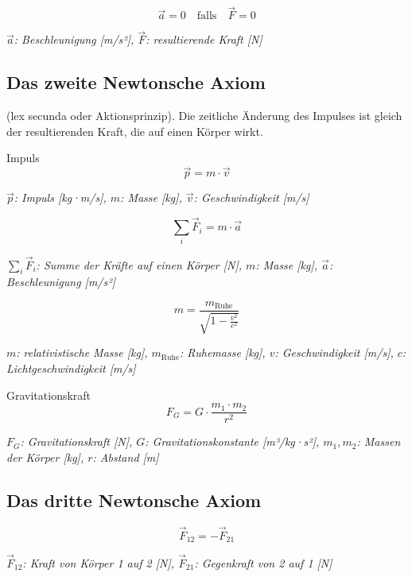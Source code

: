 \documentclass[a4paper,10pt]{article}
\newenvironment{displayformula}
{
	\begin{framed}
		\color{formulaColor}
	}
	{\end{framed}}
\newcommand{\formulalegend}[1]{%
	\par\vspace{0.5ex}%
	{{\color{legendColor}\RaggedRight\small\textit{#1}}}%
	\par\vspace{1.5ex}%
}
\begin{document}
\begin{displayformula}
	\[
	\vec{a} = 0 \quad \text{falls} \quad \vec{F} = 0
	\]
\end{displayformula}
\formulalegend{
	\( \vec{a} \): Beschleunigung [m/s²], \( \vec{F} \): resultierende Kraft [N]
}

\subsection{Das zweite Newtonsche Axiom}

\begin{displayformula}
	(lex secunda oder Aktionsprinzip). Die zeitliche Änderung des Impulses ist gleich der  
	resultierenden Kraft, die auf einen Körper wirkt.
\end{displayformula}

\begin{displayformula}
	Impuls
	\[
	\vec{p} = m \cdot \vec{v}
	\]
\end{displayformula}
\formulalegend{
	\( \vec{p} \): Impuls [kg·m/s], \( m \): Masse [kg], \( \vec{v} \): Geschwindigkeit [m/s]
}

\begin{displayformula}
	\[
	\sum_{i} \vec{F}_i = m \cdot \vec{a}
	\]
\end{displayformula}
\formulalegend{
	\( \sum_{i} \vec{F}_i \): Summe der Kräfte auf einen Körper [N], \( m \): Masse [kg], \( \vec{a} \): Beschleunigung [m/s²]
}

\begin{displayformula}
	\[
	m = \frac{m_{\text{Ruhe}}}{\sqrt{1 - \frac{v^2}{c^2}}}
	\]
\end{displayformula}
\formulalegend{
	\( m \): relativistische Masse [kg], \( m_{\text{Ruhe}} \): Ruhemasse [kg], \( v \): Geschwindigkeit [m/s], \( c \): Lichtgeschwindigkeit [m/s]
}

\begin{displayformula}
	Gravitationskraft
	\[
	F_G = G \cdot \frac{m_1 \cdot m_2}{r^2}
	\]
\end{displayformula}
\formulalegend{
	\( F_G \): Gravitationskraft [N], \( G \): Gravitationskonstante [m³/kg·s²], \( m_1, m_2 \): Massen der Körper [kg], \( r \): Abstand [m]
}

\subsection{Das dritte Newtonsche Axiom}

\begin{displayformula}
	\[
	\vec{F}_{12} = -\vec{F}_{21}
	\]
\end{displayformula}
\formulalegend{
	\( \vec{F}_{12} \): Kraft von Körper 1 auf 2 [N], \( \vec{F}_{21} \): Gegenkraft von 2 auf 1 [N]
}
\end{document}
